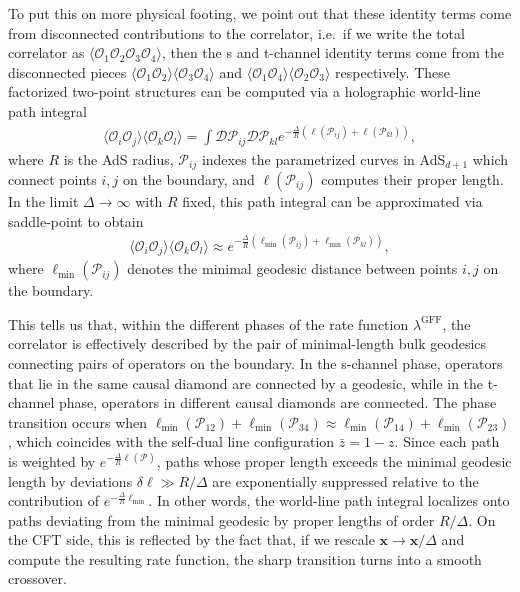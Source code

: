 \documentclass[a4paper,11pt]{article}
\theoremstyle{plain}
\theoremstyle{definition}
\theoremstyle{remark}
\newcommand{\bs}[1]{\boldsymbol{#1}}
\newcommand{\cO}{\mathcal O}
\newcommand{\ba}{\begin{equation} \begin{aligned}}
\newcommand{\ea}{\end{aligned} \end{equation}}
\newcommand{\De}{\Delta}
\begin{document}
To put this on more physical footing, we point out that these identity terms come from disconnected contributions to the correlator, i.e.~if we write the total correlator as $\langle \cO_1 \cO_2 \cO_3\cO_4\rangle$, then the s and t-channel identity terms come from the disconnected pieces $\langle \cO_1 \cO_2 \rangle \langle \cO_3 \cO_4\rangle$ and $\langle \cO_1 \cO_4 \rangle \langle \cO_2 \cO_3\rangle$ respectively. These factorized two-point structures can be computed via a holographic world-line path integral
\ba
\label{wleffectiveaction}
\langle \cO_i \cO_j \rangle \langle \cO_k \cO_l\rangle = \int \mathcal{D} \mathcal{P}_{ij} \mathcal{D} \mathcal{P}_{kl}
e^{-\frac{\De}{R}\left(  \ell(\mathcal{P}_{ij}) +\ell(\mathcal{P}_{kl})  \right)},
\ea
where $R$ is the AdS radius, $\mathcal{P}_{ij}$ indexes the parametrized curves in AdS$_{d+1}$ which connect points $i,j$ on the boundary, and $\ell(\mathcal{P}_{ij})$ computes their proper length. In the limit $\De \to \infty$ with $R$ fixed, this path integral can be approximated via saddle-point to obtain
\ba
\label{saddlepointapprox}
\langle \cO_i \cO_j \rangle \langle \cO_k \cO_l\rangle \approx e^{-\frac{\De}{R}\left(\ell_{\text{min}}(\mathcal{P}_{ij}) +\ell_{\text{min}}(\mathcal{P}_{kl})\right)},
\ea
where $\ell_{\text{min}}(\mathcal{P}_{ij})$ denotes the minimal geodesic distance between points $i,j$ on the boundary. 

This tells us that, within the different phases of the rate function $\lambda^{\text{GFF}}$, the correlator is effectively described by the pair of minimal-length bulk geodesics connecting pairs of operators on the boundary. In the s-channel phase, operators that lie in the same causal diamond are connected by a geodesic, while in the t-channel phase, operators in different causal diamonds are connected. The phase transition occurs when $\ell_{\text{min}}(\mathcal{P}_{12}) + \ell_{\text{min}}(\mathcal{P}_{34}) \approx \ell_{\text{min}}(\mathcal{P}_{14})+\ell_{\text{min}}(\mathcal{P}_{23})$, which coincides with the self-dual line configuration $\bar{z} = 1-z$. Since each path is weighted by $e^{-\frac{\De}{R}\ell(\mathcal{P})}$, paths whose proper length exceeds the minimal geodesic length by deviations $\delta\ell \gg R/\Delta$ are exponentially suppressed relative to the contribution of $e^{-\frac{\De}{R}\ell_{\min}}$. In other words, the world-line path integral localizes onto paths deviating from the minimal geodesic by proper lengths of order $R/\Delta$. On the CFT side, this is reflected by the fact that, if we rescale $\bs{x} \to \bs{x}/\De$ and compute the resulting rate function, the sharp transition turns into a smooth crossover.
 
\end{document}
